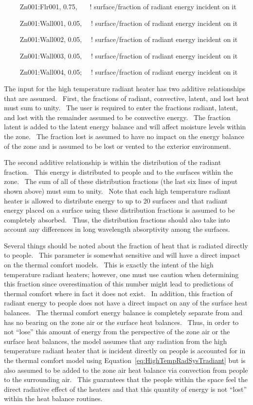 ~~~~ Zn001:Flr001, 0.75,~~~ ! surface/fraction of radiant energy incident on it

~~~~ Zn001:Wall001, 0.05,~~ ! surface/fraction of radiant energy incident on it

~~~~ Zn001:Wall002, 0.05,~~ ! surface/fraction of radiant energy incident on it

~~~~ Zn001:Wall003, 0.05,~~ ! surface/fraction of radiant energy incident on it

~~~~ Zn001:Wall004, 0.05;~~ ! surface/fraction of radiant energy incident on it

The input for the high temperature radiant heater has two additive relationships that are assumed.~ First, the fractions of radiant, convective, latent, and lost heat must sum to unity.~ The user is required to enter the fractions radiant, latent, and lost with the remainder assumed to be convective energy.~ The fraction latent is added to the latent energy balance and will affect moisture levels within the zone.~ The fraction lost is assumed to have no impact on the energy balance of the zone and is assumed to be lost or vented to the exterior environment.

The second additive relationship is within the distribution of the radiant fraction.~ This energy is distributed to people and to the surfaces within the zone.~ The sum of all of these distribution fractions (the last six lines of input shown above) must sum to unity.~ Note that each high temperature radiant heater is allowed to distribute energy to up to 20 surfaces and that radiant energy placed on a surface using these distribution fractions is assumed to be completely absorbed.~ Thus, the distribution fractions should also take into account any differences in long wavelength absorptivity among the surfaces.

Several things should be noted about the fraction of heat that is radiated directly to people.~ This parameter is somewhat sensitive and will have a direct impact on the thermal comfort models.~ This is exactly the intent of the high temperature radiant heaters; however, one must use caution when determining this fraction since overestimation of this number might lead to predictions of thermal comfort where in fact it does not exist.~ In addition, this fraction of radiant energy to people does not have a direct impact on any of the surface heat balances.~ The thermal comfort energy balance is completely separate from and has no bearing on the zone air or the surface heat balances.~ Thus, in order to not ``lose'' this amount of energy from the perspective of the zone air or the surface heat balances, the model assumes that any radiation from the high temperature radiant heater that is incident directly on people is accounted for in the thermal comfort model using Equation~\ref{eq:HighTempRadSysTradiant} but is also assumed to be added to the zone air heat balance via convection from people to the surrounding air.~ This guarantees that the people within the space feel the direct radiative effect of the heaters and that this quantity of energy is not ``lost'' within the heat balance routines.

